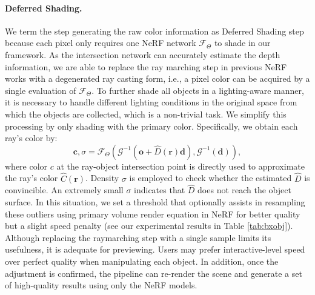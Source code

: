 \documentclass[letterpaper]{article}
\begin{document}
\paragraph{Deferred Shading.} We term the step generating the raw color information as Deferred Shading step because
each pixel only requires one NeRF network $\mathcal{F}_{\Theta}$ to shade in our framework. As the intersection network can accurately estimate the depth information, we are able to replace the ray marching step in previous NeRF works with a degenerated ray casting form,
i.e., a pixel color can be acquired by a single evaluation of $\mathcal{F}_{\Theta}$. To further shade all objects in a lighting-aware manner, it is necessary to handle different lighting conditions in the original space from which the objects are collected, which is a non-trivial task. We simplify this processing by only shading with the primary color. Specifically, we obtain each ray's color by:
\begin{equation}
    \mathbf{c},\sigma = \mathcal{F}_{\Theta}\left(\mathcal{G}^{-1}(\mathbf{o}+\hat{D}(\mathbf{r})\mathbf{d}),
    \mathcal{G}^{-1}(\mathbf{d})\right),
    \label{eq:deferred_color}
\end{equation}
where color $c$ at the ray-object intersection point is directly used to approximate the ray's color $\hat{C}(\mathbf{r})$. Density $\sigma$ is employed to check whether the estimated $\hat{D}$ is convincible. An extremely small $\sigma$ indicates that $\hat{D}$ does not reach the object surface. In this situation, we set a threshold that optionally assists in resampling these outliers using primary volume render equation in NeRF for better quality but a slight speed penalty (see our experimental results in Table \ref{tab:bxobj}).
Although replacing the raymarching step with a single sample limits its usefulness, it is adequate for previewing.
 Users may prefer interactive-level speed over perfect quality when manipulating each object. In addition, once the adjustment is confirmed, the pipeline can re-render the scene and generate a set of high-quality results using only the NeRF models.
\end{document}
